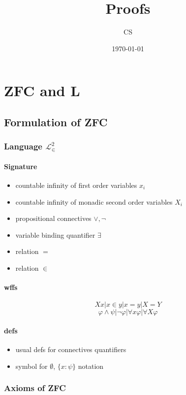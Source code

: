 \documentclass{article}
\title{Proofs}
\author{CS}
\date{\today}
\begin{document}
\maketitle

\section{ZFC and L}

\subsection{Formulation of ZFC}
\subsubsection{Language $\mathcal{L}_\in^2$}
\paragraph{Signature}
\begin{itemize}
    \item countable infinity of first order variables $x_i$
    \item countable infinity of monadic second order variables $X_i$
    \item propositional connectives $\vee, \neg$
    \item variable binding quantifier $\exists$
    \item relation $=$
    \item relation $\in$
\end{itemize}

\paragraph{wffs}
    $$Xx | x \in y | x = y | X = Y$$
    $$\varphi \wedge \psi | \neg \varphi | \forall x \varphi | \forall X \varphi $$

\paragraph{defs}
\begin{itemize}
    \item usual defs for connectives quantifiers
    \item symbol for $\emptyset$, $\{x : \psi \}$ notation
\end{itemize}

\subsubsection{Axioms of ZFC}
\end{document}
